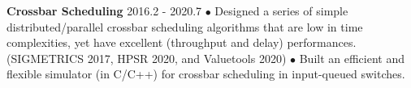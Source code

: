 \documentclass[line,11pt,letter]{includes/cls/myRes}
\begin{document}
\begin{resume}
{\setlength{\parskip}{0pt}
{\bf Crossbar Scheduling} \hfill 2016.2 - 2020.7\break
{\hspace*{1em} $\bullet$ Designed a series of simple distributed/parallel crossbar scheduling algorithms that are low in time complexities, yet have excellent (throughput and delay) performances. (SIGMETRICS 2017, HPSR 2020, and Valuetools 2020)\hfill\break}
{\hspace*{1em} $\bullet$ Built an efficient and flexible simulator (in C/C++) for crossbar scheduling in input-queued switches.\hfill\break}
\sspace
}



\end{resume}
\end{document}
